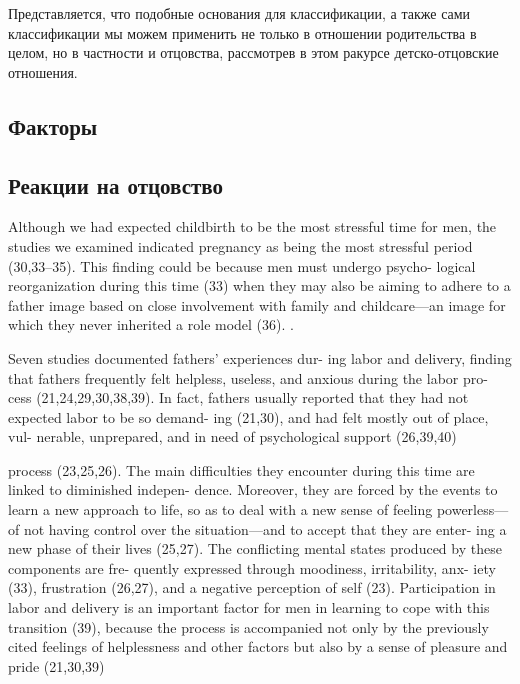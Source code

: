 \documentclass{../../common/thesisbyxetex}
\begin{document}
Представляется, что подобные основания для классификации, а также сами классификации мы можем
применить не только в отношении родительства в целом, но в частности и отцовства, рассмотрев в этом
ракурсе детско-отцовские отношения.








\subsection{Факторы}





 
\subsection{Реакции на отцовство}

Although we had expected childbirth to be the most
stressful time for men, the studies we examined indicated
pregnancy as being the most stressful period (30,33–35).
This finding could be because men must undergo psycho-
logical reorganization during this time (33) when they
may also be aiming to adhere to a father image based
on close involvement with family and childcare—an
image for which they never inherited a role model (36).
 \cite[313]{flit}.


 Seven studies documented fathers’ experiences dur-
ing labor and delivery, finding that fathers frequently
felt helpless, useless, and anxious during the labor pro-
cess (21,24,29,30,38,39). In fact, fathers usually reported
that they had not expected labor to be so demand-
ing (21,30), and had felt mostly out of place, vul-
nerable, unprepared, and in need of psychological
support (26,39,40)\cite[313]{flit}


process (23,25,26). The main difficulties they encounter
during this time are linked to diminished indepen-
dence. Moreover, they are forced by the events to
learn a new approach to life, so as to deal with a
new sense of feeling powerless—of not having control
over the situation—and to accept that they are enter-
ing a new phase of their lives (25,27). The conflicting
mental states produced by these components are fre-
quently expressed through moodiness, irritability, anx-
iety (33), frustration (26,27), and a negative perception
of self (23). Participation in labor and delivery is an
important factor for men in learning to cope with this
transition (39), because the process is accompanied not
only by the previously cited feelings of helplessness
and other factors but also by a sense of pleasure and
pride (21,30,39) \cite[314]{flit}
\end{document}
